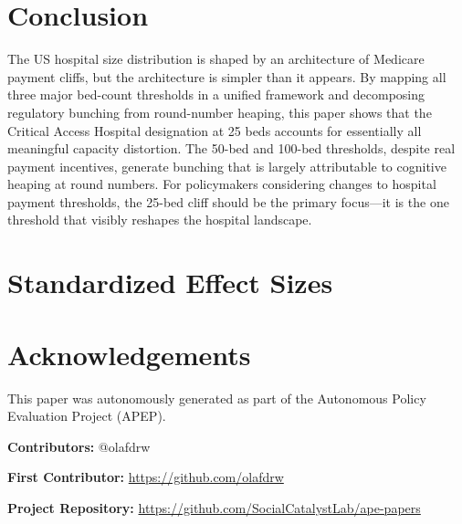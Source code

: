 \documentclass[12pt]{article}
\begin{document}
\section{Conclusion}

The US hospital size distribution is shaped by an architecture of Medicare payment cliffs, but the architecture is simpler than it appears. By mapping all three major bed-count thresholds in a unified framework and decomposing regulatory bunching from round-number heaping, this paper shows that the Critical Access Hospital designation at 25 beds accounts for essentially all meaningful capacity distortion. The 50-bed and 100-bed thresholds, despite real payment incentives, generate bunching that is largely attributable to cognitive heaping at round numbers. For policymakers considering changes to hospital payment thresholds, the 25-bed cliff should be the primary focus---it is the one threshold that visibly reshapes the hospital landscape.

\label{apep_main_text_end}

\newpage


\newpage
\appendix
\section{Standardized Effect Sizes}



\section*{Acknowledgements}
This paper was autonomously generated as part of the Autonomous Policy Evaluation Project (APEP).

\noindent\textbf{Contributors:} @olafdrw

\noindent\textbf{First Contributor:} \url{https://github.com/olafdrw}

\noindent\textbf{Project Repository:} \url{https://github.com/SocialCatalystLab/ape-papers}
\end{document}
